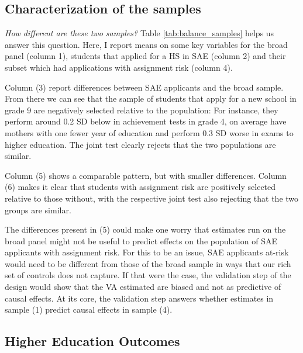 \documentclass[a4paper, article, english, oneside, unknownkeysallowed, 12pt]{memoir}
\begin{document}
\subsection{Characterization of the samples}

\textit{How different are these two samples?} Table \ref{tab:balance_samples} helps us answer this question. 
Here, I report means on some key variables for the broad panel (column 1), 
students that applied for a HS in SAE (column 2) and their subset which had applications with assignment risk (column 4).




Column (3) report differences between SAE applicants and the broad sample. 
From there we can see that the sample of students that apply for a new school in grade 9 are negatively selected relative to the population:
For instance, they perform around 0.2 SD below in achievement tests in grade 4, on average have mothers with one fewer year of education and perform 0.3 SD worse in exams to higher education.
The joint test clearly rejects that the two populations are similar.

Column (5) shows a comparable pattern, but with smaller differences.
Column (6) makes it clear that students with assignment risk are positively selected relative to those without, 
with the respective joint test also rejecting that the two groups are similar. 

The differences present in (5) could make one worry that estimates run on the broad panel might not be useful to predict effects on the population of SAE applicants with assignment risk.
For this to be an issue, SAE applicants at-risk would need to be different from those of the broad sample in ways that our rich set of controls does not capture. 
If that were the case, the validation step of the design would show that the VA estimated are biased and not as predictive of causal effects.
At its core, the validation step answers whether estimates in sample (1) predict causal effects in sample (4).


\subsection{Higher Education Outcomes}
\end{document}
